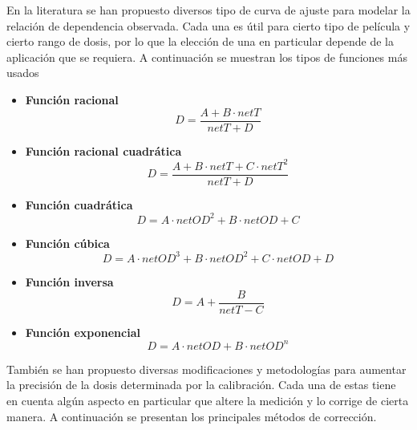 En la literatura se han propuesto diversos tipo de curva de ajuste para modelar la relación de dependencia observada. Cada una es útil para cierto tipo de película y cierto rango de dosis, por lo que la elección de una en particular depende de la aplicación que se requiera. A continuación se muestran los tipos de funciones más usados \\

\begin{itemize}
\item\textbf{Función racional}\\
\begin{equation}
	D=\frac{A+B\cdot netT}{netT+D}
\end{equation}
\item\textbf{Función racional cuadrática}\\
\begin{equation}
D=\frac{A+B\cdot netT+C\cdot netT^2}{netT+D}
\end{equation}
\item\textbf{Función cuadrática}\\
\begin{equation}
D=A\cdot netOD^2+B\cdot netOD+C
\end{equation}
\item\textbf{Función cúbica}\\
\begin{equation}
D=A\cdot netOD^3+B\cdot netOD^2+C\cdot netOD +D 
\end{equation}

\item\textbf{Función inversa}\\
\begin{equation}
D=A+\frac{B}{netT-C}
\end{equation}

\item\textbf{Función exponencial}\\
\begin{equation}
D=A\cdot netOD+B\cdot netOD^n
\end{equation}
\end{itemize}

También se han propuesto diversas modificaciones y metodologías para aumentar la precisión de la dosis determinada por la calibración. Cada una de estas tiene en cuenta algún aspecto en particular que altere la medición y lo corrige de cierta manera. A continuación se presentan los principales métodos de corrección.\\


